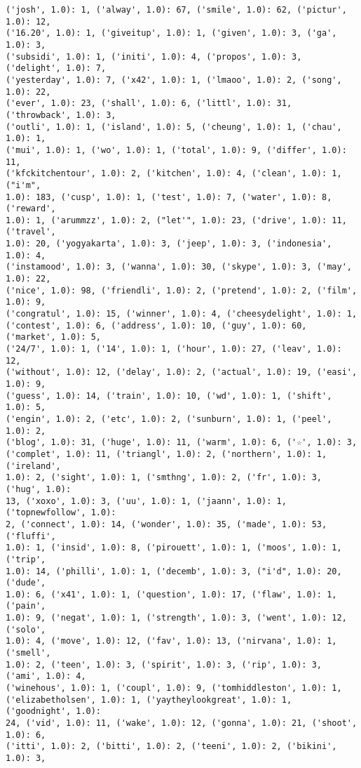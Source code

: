 \documentclass[11pt]{article}
\begin{document}
\begin{Verbatim}[commandchars=\\\{\}]
('josh', 1.0): 1, ('alway', 1.0): 67, ('smile', 1.0): 62, ('pictur', 1.0): 12,
('16.20', 1.0): 1, ('giveitup', 1.0): 1, ('given', 1.0): 3, ('ga', 1.0): 3,
('subsidi', 1.0): 1, ('initi', 1.0): 4, ('propos', 1.0): 3, ('delight', 1.0): 7,
('yesterday', 1.0): 7, ('x42', 1.0): 1, ('lmaoo', 1.0): 2, ('song', 1.0): 22,
('ever', 1.0): 23, ('shall', 1.0): 6, ('littl', 1.0): 31, ('throwback', 1.0): 3,
('outli', 1.0): 1, ('island', 1.0): 5, ('cheung', 1.0): 1, ('chau', 1.0): 1,
('mui', 1.0): 1, ('wo', 1.0): 1, ('total', 1.0): 9, ('differ', 1.0): 11,
('kfckitchentour', 1.0): 2, ('kitchen', 1.0): 4, ('clean', 1.0): 1, ("i'm",
1.0): 183, ('cusp', 1.0): 1, ('test', 1.0): 7, ('water', 1.0): 8, ('reward',
1.0): 1, ('arummzz', 1.0): 2, ("let'", 1.0): 23, ('drive', 1.0): 11, ('travel',
1.0): 20, ('yogyakarta', 1.0): 3, ('jeep', 1.0): 3, ('indonesia', 1.0): 4,
('instamood', 1.0): 3, ('wanna', 1.0): 30, ('skype', 1.0): 3, ('may', 1.0): 22,
('nice', 1.0): 98, ('friendli', 1.0): 2, ('pretend', 1.0): 2, ('film', 1.0): 9,
('congratul', 1.0): 15, ('winner', 1.0): 4, ('cheesydelight', 1.0): 1,
('contest', 1.0): 6, ('address', 1.0): 10, ('guy', 1.0): 60, ('market', 1.0): 5,
('24/7', 1.0): 1, ('14', 1.0): 1, ('hour', 1.0): 27, ('leav', 1.0): 12,
('without', 1.0): 12, ('delay', 1.0): 2, ('actual', 1.0): 19, ('easi', 1.0): 9,
('guess', 1.0): 14, ('train', 1.0): 10, ('wd', 1.0): 1, ('shift', 1.0): 5,
('engin', 1.0): 2, ('etc', 1.0): 2, ('sunburn', 1.0): 1, ('peel', 1.0): 2,
('blog', 1.0): 31, ('huge', 1.0): 11, ('warm', 1.0): 6, ('☆', 1.0): 3,
('complet', 1.0): 11, ('triangl', 1.0): 2, ('northern', 1.0): 1, ('ireland',
1.0): 2, ('sight', 1.0): 1, ('smthng', 1.0): 2, ('fr', 1.0): 3, ('hug', 1.0):
13, ('xoxo', 1.0): 3, ('uu', 1.0): 1, ('jaann', 1.0): 1, ('topnewfollow', 1.0):
2, ('connect', 1.0): 14, ('wonder', 1.0): 35, ('made', 1.0): 53, ('fluffi',
1.0): 1, ('insid', 1.0): 8, ('pirouett', 1.0): 1, ('moos', 1.0): 1, ('trip',
1.0): 14, ('philli', 1.0): 1, ('decemb', 1.0): 3, ("i'd", 1.0): 20, ('dude',
1.0): 6, ('x41', 1.0): 1, ('question', 1.0): 17, ('flaw', 1.0): 1, ('pain',
1.0): 9, ('negat', 1.0): 1, ('strength', 1.0): 3, ('went', 1.0): 12, ('solo',
1.0): 4, ('move', 1.0): 12, ('fav', 1.0): 13, ('nirvana', 1.0): 1, ('smell',
1.0): 2, ('teen', 1.0): 3, ('spirit', 1.0): 3, ('rip', 1.0): 3, ('ami', 1.0): 4,
('winehous', 1.0): 1, ('coupl', 1.0): 9, ('tomhiddleston', 1.0): 1,
('elizabetholsen', 1.0): 1, ('yaytheylookgreat', 1.0): 1, ('goodnight', 1.0):
24, ('vid', 1.0): 11, ('wake', 1.0): 12, ('gonna', 1.0): 21, ('shoot', 1.0): 6,
('itti', 1.0): 2, ('bitti', 1.0): 2, ('teeni', 1.0): 2, ('bikini', 1.0): 3,

\end{Verbatim}
\end{document}

